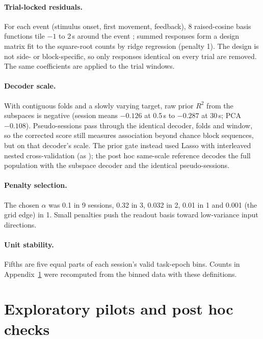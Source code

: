 \documentclass{article}
\begin{document}
\paragraph{Trial-locked residuals.} For each event (stimulus onset, first movement, feedback), 8 raised-cosine basis
functions tile $-1$ to 2\,s around the event \citep{pillow2008}; summed responses form a design matrix fit to the
square-root counts by ridge regression (penalty 1). The design is not side- or block-specific, so only responses
identical on every trial are removed. The same coefficients are applied to the trial windows.

\paragraph{Decoder scale.} With contiguous folds and a slowly varying target, raw prior $R^2$ from the subspaces is
negative (session means $-0.126$ at 0.5\,s to $-0.287$ at 30\,s; PCA $-0.108$). Pseudo-sessions pass through the
identical decoder, folds and window, so the corrected score still measures association beyond chance block sequences,
but on that decoder's scale. The prior gate instead used Lasso with interleaved nested cross-validation (as
\citealp{findling2025}); the post hoc same-scale reference decodes the full population with the subspace decoder and
the identical pseudo-sessions.

\paragraph{Penalty selection.} The chosen $\alpha$ was 0.1 in 9 sessions, 0.32 in 3, 0.032 in 2, 0.01 in 1 and 0.001
(the grid edge) in 1. Small penalties push the readout basis toward low-variance input directions.

\paragraph{Unit stability.} Fifths are five equal parts of each session's valid task-epoch bins. Counts in
Appendix~\ref{app:pilots} were recomputed from the binned data with these definitions.

\section{Exploratory pilots and post hoc checks}
\label{app:pilots}
\end{document}
